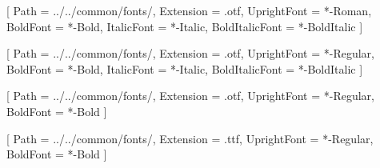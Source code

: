 \usepackage{fontspec}
\usepackage{kotex}

\setmainfont{TimesLTStd}[
    Path = ../../common/fonts/,
    Extension = .otf,
    UprightFont = *-Roman,
    BoldFont = *-Bold,
    ItalicFont = *-Italic,
    BoldItalicFont = *-BoldItalic
    ]

\setsansfont{Inter}[
    Path = ../../common/fonts/,
    Extension = .otf,
    UprightFont = *-Regular,
    BoldFont = *-Bold,
    ItalicFont = *-Italic,
	BoldItalicFont = *-BoldItalic
    ]


[
    Path = ../../common/fonts/,
    Extension = .otf,
    UprightFont = *-Regular,
    BoldFont = *-Bold
    ]

[
    Path = ../../common/fonts/,
    Extension = .ttf,
    UprightFont = *-Regular,
    BoldFont = *-Bold
    ]
